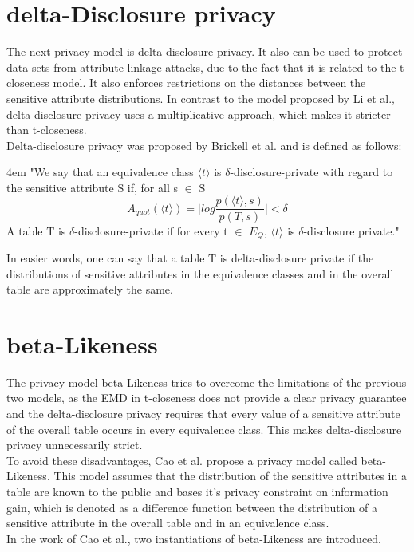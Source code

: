 \documentclass[12pt, a4paper,oneside]{report}
\begin{document}
\section{delta-Disclosure privacy}

The next privacy model is delta-disclosure privacy. It also can be used to protect data sets from attribute linkage attacks, due to the fact that it is related to the t-closeness model. It also enforces restrictions on the distances between the sensitive attribute distributions. In contrast to the model proposed by Li et al., delta-disclosure privacy uses a multiplicative approach, which makes it stricter than t-closeness\cite{Brickell2008}. \\
Delta-disclosure privacy was proposed by Brickell et al. and is defined as follows: \\
\par
\begingroup
\leftskip4em
\rightskip\leftskip
"We say that an equivalence class $\langle t\rangle$ is $\delta$-disclosure-private with regard to the sensitive attribute S if, for all s $\in$ S
\[ A_{quot}(\langle t\rangle) = \Biggl| log\frac{p(\langle t\rangle,s)}{p(T,s)} \Biggl| < \delta \]
A table T is $\delta$-disclosure-private if for every t $\in$ $E_Q$, $\langle t\rangle$ is $\delta$-disclosure private."\cite{Brickell2008}\\
\par
\endgroup

In easier words, one can say that a table T is delta-disclosure private if the distributions of sensitive attributes in the equivalence classes and in the overall table are approximately the same\cite{Brickell2008}.

\section{beta-Likeness}

The privacy model beta-Likeness tries to overcome the limitations of the previous two models, as the EMD in t-closeness does not provide a clear privacy guarantee and the delta-disclosure privacy requires that every value of a sensitive attribute of the overall table occurs in every equivalence class. This makes delta-disclosure privacy unnecessarily strict.\\
To avoid these disadvantages, Cao et al. propose a privacy model called beta-Likeness. This model assumes that the distribution of the sensitive attributes in a table are known to the public and bases it's privacy constraint on information gain, which is denoted as a difference function between the distribution of a sensitive attribute in the overall table and in an equivalence class\cite{Cao2012}.\\
In the work of Cao et al., two instantiations of beta-Likeness are introduced.   
\end{document}
